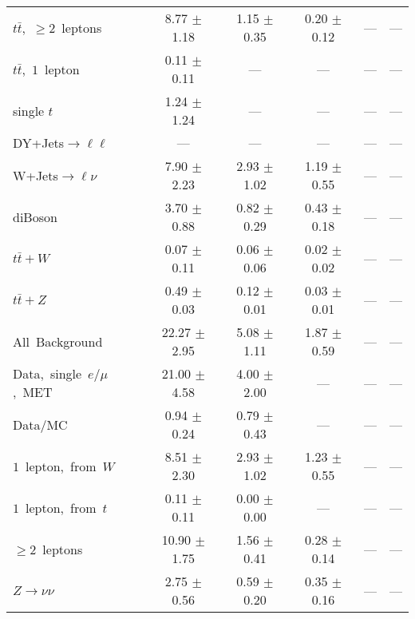 \documentclass{article}
\begin{document}
\begin{longtable}{|l|c|c|c|c|c|}
$t\bar{t}$,~$\ge2$~leptons & 8.77 $\pm$ 1.18  & 1.15 $\pm$ 0.35  & 0.20 $\pm$ 0.12  & ---  & --- \\* 
$t\bar{t}$,~$1$~lepton & 0.11 $\pm$ 0.11  & ---  & ---  & ---  & --- \\* 
single $t$  & 1.24 $\pm$ 1.24  & ---  & ---  & ---  & --- \\* 
DY+Jets$\rightarrow\ell\ell$  & ---  & ---  & ---  & ---  & --- \\* 
W+Jets$\rightarrow\ell\nu$  & 7.90 $\pm$ 2.23  & 2.93 $\pm$ 1.02  & 1.19 $\pm$ 0.55  & ---  & --- \\* 
diBoson  & 3.70 $\pm$ 0.88  & 0.82 $\pm$ 0.29  & 0.43 $\pm$ 0.18  & ---  & --- \\* 
$t\bar{t}+W$  & 0.07 $\pm$ 0.11  & 0.06 $\pm$ 0.06  & 0.02 $\pm$ 0.02  & ---  & --- \\* 
$t\bar{t}+Z$  & 0.49 $\pm$ 0.03  & 0.12 $\pm$ 0.01  & 0.03 $\pm$ 0.01  & ---  & --- \\* 
\hline \hline 
All~Background  & 22.27 $\pm$ 2.95  & 5.08 $\pm$ 1.11  & 1.87 $\pm$ 0.59  & ---  & --- \\* 
Data,~single~$e/\mu$,~MET  & 21.00 $\pm$ 4.58  & 4.00 $\pm$ 2.00  & ---  & ---  & --- \\* 
Data/MC  & 0.94 $\pm$ 0.24  & 0.79 $\pm$ 0.43  & ---  & ---  & --- \\* 
\hline \hline 
$1$~lepton,~from~$W$  & 8.51 $\pm$ 2.30  & 2.93 $\pm$ 1.02  & 1.23 $\pm$ 0.55  & ---  & --- \\* 
$1$~lepton,~from~$t$  & 0.11 $\pm$ 0.11  & 0.00 $\pm$ 0.00  & ---  & ---  & --- \\* 
$\ge2$~leptons  & 10.90 $\pm$ 1.75  & 1.56 $\pm$ 0.41  & 0.28 $\pm$ 0.14  & ---  & --- \\* 
$Z\rightarrow\nu\nu$  & 2.75 $\pm$ 0.56  & 0.59 $\pm$ 0.20  & 0.35 $\pm$ 0.16  & ---  & --- \\* 
\hline 
\end{longtable} 

 
 
 
 
\pagebreak 

 
 
 
 
\end{document}
